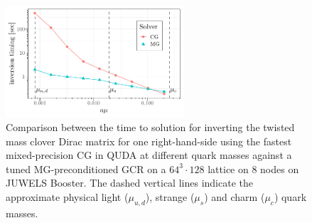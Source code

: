 \begin{figure}
	\includegraphics[width=0.59\textwidth]{./plots/mg_vs_cg.pdf}
	\caption{Comparison between the time to solution for inverting the
    twisted mass clover Dirac matrix for one right-hand-side using
    the fastest mixed-precision CG in QUDA at different quark masses 
    against a tuned MG-preconditioned GCR on a $64^3\cdot128$ lattice
    on 8 nodes on JUWELS Booster. The dashed vertical lines indicate the
    approximate physical light ($\mu_{u,d}$), strange ($\mu_s$) and
    charm ($\mu_c$) quark masses.}
	\label{fig:multi-grid}
\end{figure}




\endinput
